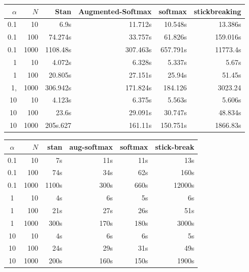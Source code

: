 \documentclass[11pt]{article}
\begin{document}
\begin{table}[!ht]
    \centering
    \begin{tabular}{r|r|r|r|r|r|}
    \hline
        $\alpha$ & $N$ & Stan & Augmented-Softmax & softmax & stickbreaking \\ \hline
        0.1 & 10  & 6.9s & 11.712s & 10.548s & 13.386s \\ 
        0.1 & 100 & 74.274s & 33.757s & 61.826s & 159.016s \\ 
        0.1 & 1000 & 1108.48s & 307.463s & 657.791s & 11773.4s \\ 
        1 & 10 & 4.072s & 6.328s & 5.337s & 5.67s \\ 
        1 & 100 & 20.805s & 27.151s & 25.94s & 51.45s \\ 
        1, & 1000 & 306.942s & 171.824s & 184.126 & 3023.24 \\ 
        10 & 10 & 4.123s & 6.375s & 5.563s & 5.606s \\ 
        10 & 100 & 23.6s & 29.091s & 30.747s & 48.834s \\ 
        10 & 1000 & 205s.627 & 161.11s & 150.751s & 1866.83s \\ \hline
    \end{tabular}
\end{table}

\begin{table}[!ht]
    \centering
    \begin{tabular}{c|r||r|r|r|r|}
        $\alpha$ & $N$ & stan & aug-softmax & softmax & stick-break \\ \hline 
        0.1 & 10  & 7s & 11s & 11s & 13s \\ 
        0.1 & 100 & 74s & 34s & 62s & 160s \\ 
        0.1 & 1000 & 1100s & 300s & 660s & 12000s \\ 
        1 & 10 & 4s & 6s & 5s & 6s \\ 
        1 & 100 & 21s & 27s & 26s & 51s \\ 
        1 & 1000 & 300s & 170s & 180s & 3000s \\ 
        10 & 10 & 4s & 6s & 6s & 5s \\ 
        10 & 100 & 24s & 29s & 31s & 49s \\ 
        10 & 1000 & 200s & 160s & 150s & 1900s \\
    \end{tabular}
\end{table}
\end{document}
